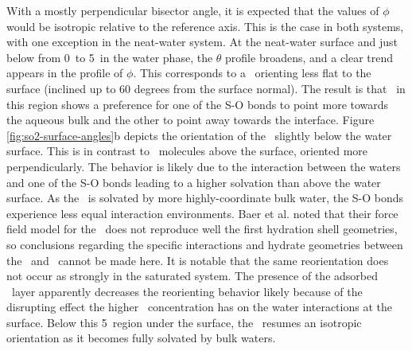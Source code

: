   With a mostly perpendicular bisector angle, it is expected that the values of $\phi$ would be isotropic relative to the reference axis. This is the case in both systems, with one exception in the neat-water system. At the neat-water surface and just below from 0\angs~to 5\angs~in the water phase, the $\theta$ profile broadens, and a clear trend appears in the profile of $\phi$. This corresponds to a \suldiox~orienting less flat to the surface (inclined up to 60 degrees from the surface normal). The result is that \suldiox~in this region shows a preference for one of the S-O bonds to point more towards the aqueous bulk and the other to point away towards the interface. Figure \ref{fig:so2-surface-angles}b depicts the orientation of the \suldiox~slightly below the water surface. This is in contrast to \suldiox~molecules above the surface, oriented more perpendicularly. The behavior is likely due to the interaction between the waters and one of the S-O bonds leading to a higher solvation than above the water surface. As the \suldiox~is solvated by more highly-coordinate bulk water, the S-O bonds experience less equal interaction environments. Baer et al. noted that their force field model for the \suldiox~does not reproduce well the first hydration shell geometries,\cite{Baer2010} so conclusions regarding the specific interactions and hydrate geometries between the \suldiox~and \wat~cannot be made here. It is notable that the same reorientation does not occur as strongly in the saturated system. The presence of the adsorbed \suldiox~layer apparently decreases the reorienting behavior likely because of the disrupting effect the higher \suldiox~concentration has on the water interactions at the surface. Below this 5\angs~region under the surface, the \suldiox~resumes an isotropic orientation as it becomes fully solvated by bulk waters.



